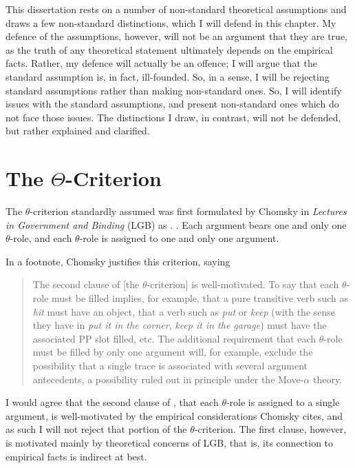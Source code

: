 \documentclass[MilwayThesis]{subfiles}
\begin{document}
This dissertation rests on a number of non-standard theoretical assumptions and draws a few non-standard distinctions, which I will defend in this chapter.
My defence of the assumptions, however, will not be an argument that they are true, as the truth of any theoretical statement ultimately depends on the empirical facts.
Rather, my defence will actually be an offence; I will argue that the standard assumption is, in fact, ill-founded.
So, in a sense, I will be rejecting standard assumptions rather than making non-standard ones.
So, I will identify issues with the standard assumptions, and present non-standard ones which do not face those issues.
The distinctions I draw, in contrast, will not be defended, but rather explained and clarified.

\section{The $\Theta$-Criterion}
The $\theta$-criterion standardly assumed was first formulated by Chomsky in \textit{Lectures in Government and Binding} (LGB) as \Next.
\ex. Each argument bears one and only one $\theta$-role, and each $\theta$-role is assigned to one and only one argument. \parencite[36]{chomsky1981lectures}

In a footnote, Chomsky justifies this criterion, saying 
\begin{quote}
	The second clause of [the $\theta$-criterion] is well-motivated.
	To say that each $\theta$-role must be filled implies, for example, that a pure transitive verb such as \textit{hit} must have an object, that a verb such as \textit{put} or \textit{keep} (with the sense they have in \textit{put it in the corner}, \textit{keep it in the garage}) must have the associated PP slot filled, etc. 
	The additional requirement that each $\theta$-role must be filled by only one argument will, for example, exclude the possibility that a single trace is associated with several argument antecedents, a possibility ruled out in principle under the Move-$\alpha$ theory. 
	\parencite[139]{chomsky1981lectures}
\end{quote}
I would agree that the second clause of \Last, that each $\theta$-role is assigned to a single argument, is well-motivated by the empirical considerations Chomsky cites, and as such I will not reject that portion of the $\theta$-criterion.
The first clause, however, is motivated mainly by theoretical concerns of LGB, that is, its connection to empirical facts is indirect at best.
\end{document}
